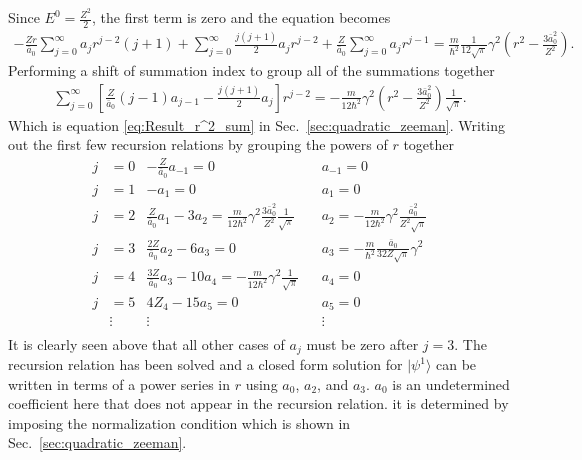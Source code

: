     \noindent Since $E^0 = \frac{Z^2}{2}$, the first term is zero and the equation becomes 
    \begin{align*}
        -\frac{Zr}{\bar{a}_0} \sum_{j = 0}^\infty a_j r^{j - 2} (j + 1) + \sum_{j = 0}^\infty \frac{j(j+1)}{2} a_j r^{j - 2} + \frac{Z}{\bar{a}_0} \sum_{j = 0}^\infty a_j r^{j-1} = \frac{m}{\hbar^2}\frac{1}{12\sqrt{\pi}} \gamma^2 \left(r^2 - \frac{3\bar{a}_0^2}{Z^2} \right).
    \end{align*}
    \noindent Performing a shift of summation index to group all of the summations together 
    \begin{align}
        \sum_{j = 0}^\infty \left[ \frac{Z}{\bar{a}_0}(j-1) a_{j-1} - \frac{j(j+1)}{2} a_j \right] r^{j-2} = -\frac{m}{12 \hbar^2} \gamma^2 \left(r^2 - \frac{3\bar{a}_0^2}{Z^2} \right) \frac{1}{\sqrt{\pi}}.
    \end{align}
    \noindent Which is equation \eqref{eq:Result_r^2_sum} in Sec.~\ref{sec:quadratic_zeeman}. Writing out the first few recursion relations by grouping the powers of $r$ together 
    \begin{align*}
        j &= 0 & -\frac{Z}{\bar{a}_0}a_{-1} = 0& &a_{-1} = 0\\ \nonumber
        j &= 1 & -a_1 = 0& &a_{1} = 0\\ \nonumber
        j &= 2 & \frac{Z}{\bar{a}_0} a_1 - 3a_2 = \frac{m}{12 \hbar^2} \gamma^2 \frac{3\bar{a}_0^2}{Z^2}\frac{1}{\sqrt{\pi}} & &a_2 = -\frac{m}{12 \hbar^2} \gamma^2 \frac{\bar{a}_0^2}{Z^2 \sqrt{\pi}}\\ \nonumber
        j &= 3 & \frac{2Z}{\bar{a}_0}a_2 - 6a_3 = 0&& a_3 = -\frac{m}{\hbar^2}\frac{\bar{a}_0}{32Z\sqrt{\pi}} \gamma^2\\ \nonumber
        j &= 4 & \frac{3Z}{\bar{a}_0}a_3 - 10a_4 = -\frac{m}{12 \hbar^2} \gamma^2 \frac{1}{\sqrt{\pi}} && a_4 = 0\\ \nonumber
        j &= 5 & 4Z_4 - 15a_5 = 0 && a_5 = 0 \\ \nonumber
        & \vdots & \vdots && \vdots \\
    \end{align*}
    \noindent It is clearly seen above that all other cases of $a_j$ must be zero after $j = 3$. The recursion relation has been solved and a closed form solution for $\vert \psi^1 \rangle$ can be written in terms of a power series in $r$ using $a_0$, $a_2$, and $a_3$. $a_0$ is an undetermined coefficient here that does not appear in the recursion relation. it is determined by imposing the normalization condition which is shown in Sec.~\ref{sec:quadratic_zeeman}.\\


